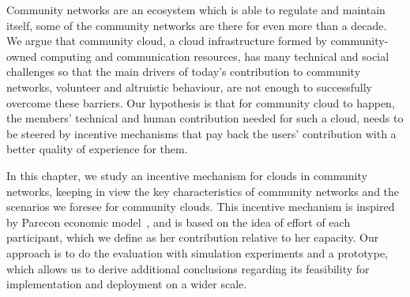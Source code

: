 
Community networks are an ecosystem which is able to regulate and maintain itself, some of the community networks are there for even more than a decade. 
We argue that community cloud, a cloud infrastructure formed by community-owned computing and communication resources, 
has many technical and social challenges so that the main drivers of today's contribution to community networks, 
volunteer and altruistic behaviour, are not enough to successfully overcome these barriers. 
Our hypothesis is that for community cloud to happen, the  members' technical and human contribution needed for such a cloud, 
needs to be steered by incentive mechanisms that pay back the users' contribution with a better quality of experience for them.

In this chapter, we study an incentive mechanism for clouds in community networks, 
keeping in view the key characteristics of community networks 
and the scenarios we foresee for community clouds. 
This incentive mechanism is inspired by Parecon economic model~\cite{Albert2004Parecon, Rahman2010, Vega2013Sharing},
and is based on the idea of effort of each participant, which we define as her contribution relative to her capacity.
Our approach is to do the evaluation with simulation experiments and a prototype, 
which allows us to derive additional conclusions regarding its feasibility for implementation and deployment on a wider scale. 

